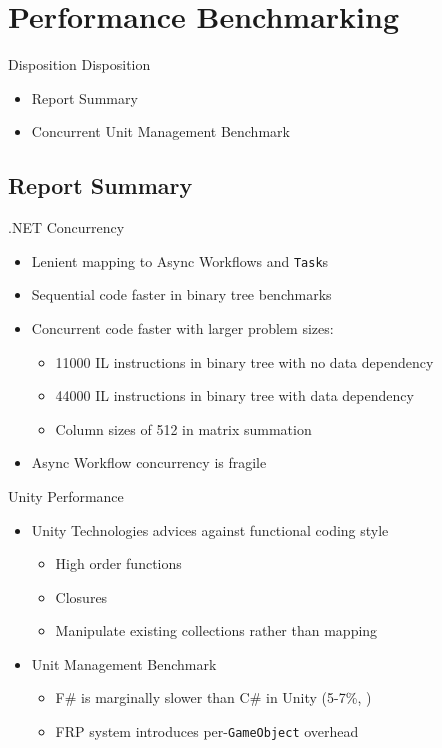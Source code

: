 \section{Performance Benchmarking}
\begin{frame}{\secname}{Disposition}
	Disposition
    \begin{itemize}
        \item Report Summary
        \item Concurrent Unit Management Benchmark
	\end{itemize}
\end{frame}

\subsection{Report Summary}\label{sec:authors}
\begin{frame}{\secname}{\subsecname}
	.NET Concurrency
	\begin{itemize}
		\item Lenient mapping to Async Workflows and \texttt{Task}s %
		\item Sequential code faster in binary tree benchmarks
		\item Concurrent code faster with larger problem sizes:
		\begin{itemize}
			\item 11000 IL instructions in binary tree with no data dependency
			\item 44000 IL instructions in binary tree with data dependency
			\item Column sizes of 512 in matrix summation
		\end{itemize}
		\item Async Workflow concurrency is fragile
	\end{itemize}
\end{frame}

\begin{frame}{\secname}{\subsecname}
	Unity Performance
	\begin{itemize}
		\item Unity Technologies advices against functional coding style
		\begin{itemize}
			\item High order functions
			\item Closures
			\item Manipulate existing collections rather than mapping
		\end{itemize}
		\item Unit Management Benchmark
		\begin{itemize}
			\item F\# is marginally slower than C\# in Unity (5-7\%, \cite{maggiore2012formal,bolhuis2019gameplay})
			\item FRP system introduces per-\texttt{GameObject} overhead
		\end{itemize}
	\end{itemize}
\end{frame}

